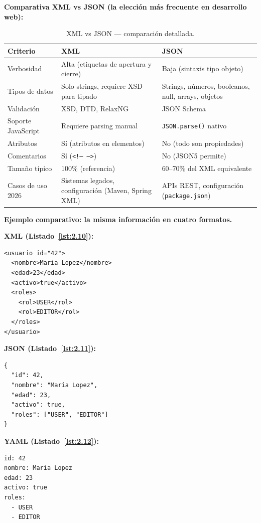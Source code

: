 \textbf{Comparativa XML vs JSON (la elección más frecuente en
desarrollo web):}

\begin{table}[htbp]
\centering
\caption{XML vs JSON --- comparación detallada.}
\footnotesize
\begin{tabularx}{\textwidth}{lXX}
\toprule
\textbf{Criterio} & \textbf{XML} & \textbf{JSON}\\
\midrule
Verbosidad & Alta (etiquetas de apertura y cierre) & Baja (sintaxis tipo objeto)\\
Tipos de datos & Solo strings, requiere XSD para tipado & Strings, números, booleanos, null, arrays, objetos\\
Validación & XSD, DTD, RelaxNG & JSON Schema\\
Soporte JavaScript & Requiere parsing manual & \texttt{JSON.parse()} nativo\\
Atributos & Sí (atributos en elementos) & No (todo son propiedades)\\
Comentarios & Sí (\texttt{<!-- -->}) & No (JSON5 permite)\\
Tamaño típico & 100\% (referencia) & 60--70\% del XML equivalente\\
Casos de uso 2026 & Sistemas legados, configuración (Maven, Spring XML) & APIs REST, configuración (\texttt{package.json})\\
\bottomrule
\end{tabularx}
\end{table}

\textbf{Ejemplo comparativo: la misma información en cuatro formatos.}

\textbf{XML (Listado~\ref{lst:2.10}):}
\begin{lstlisting}[style=xml,numbers=none,caption={Ejemplo de XML},label=lst:2.10]
<usuario id="42">
  <nombre>Maria Lopez</nombre>
  <edad>23</edad>
  <activo>true</activo>
  <roles>
    <rol>USER</rol>
    <rol>EDITOR</rol>
  </roles>
</usuario>
\end{lstlisting}

\textbf{JSON (Listado~\ref{lst:2.11}):}
\begin{lstlisting}[style=js,numbers=none,caption={Ejemplo de JavaScript},label=lst:2.11]
{
  "id": 42,
  "nombre": "Maria Lopez",
  "edad": 23,
  "activo": true,
  "roles": ["USER", "EDITOR"]
}
\end{lstlisting}

\textbf{YAML (Listado~\ref{lst:2.12}):}
\begin{lstlisting}[numbers=none,basicstyle=\ttfamily\footnotesize,frame=single,caption={Ejemplo de Código},label=lst:2.12]
id: 42
nombre: Maria Lopez
edad: 23
activo: true
roles:
  - USER
  - EDITOR
\end{lstlisting}

